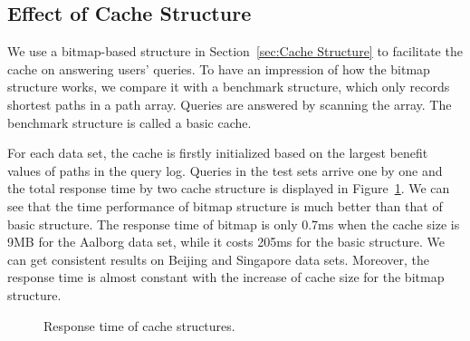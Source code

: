 \subsection{Effect of Cache Structure}
\label{sec:effect-cache-structure}
We use a bitmap-based structure in Section~\ref{sec:Cache Structure} to facilitate the cache on answering users' queries.
To have an impression of how the bitmap structure works, we compare it with a benchmark structure, which only records shortest paths in a path array.
Queries are answered by scanning the array.
The benchmark structure is called a basic cache.

For each data set, the cache is firstly initialized based on the largest benefit values of paths in the query log. Queries in the test sets arrive one by one and the total response time by two cache structure is displayed in Figure~\ref{fig:time-cache-structure}. We can see that the time performance of bitmap structure is much better than that of basic structure. The response time of bitmap is only 0.7ms when the cache size is 9MB for the Aalborg data set, while it costs 205ms for the basic structure. We can get consistent results on Beijing and Singapore data sets.
Moreover, the response time is almost constant with the increase of cache size for the bitmap structure.
\begin{figure}[htbp]
\centering
 \caption{Response time of cache structures.}
 \label{fig:time-cache-structure}
\end{figure}


